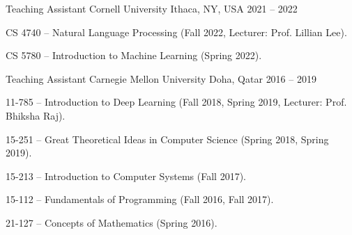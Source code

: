 
\begin{cventries}
  \cventry
    {Teaching Assistant}
    {Cornell University}
    {Ithaca, NY, USA}
    {2021 -- 2022}
    {
      \begin{cvitems}
        \item CS 4740 -- Natural Language Processing (Fall 2022, Lecturer: Prof. Lillian Lee).
        \item CS 5780 -- Introduction to Machine Learning (Spring 2022).
      \end{cvitems}
    }

  \cventry
    {Teaching Assistant}
    {Carnegie Mellon University}
    {Doha, Qatar}
    {2016 -- 2019}
    {
      \begin{cvitems}
        \item 11-785 -- Introduction to Deep Learning (Fall 2018, Spring 2019, Lecturer: Prof. Bhiksha Raj).
        \item 15-251 -- Great Theoretical Ideas in Computer Science (Spring 2018, Spring 2019).
        \item 15-213 -- Introduction to Computer Systems (Fall 2017).
        \item 15-112 -- Fundamentals of Programming (Fall 2016, Fall 2017).
        \item 21-127 -- Concepts of Mathematics (Spring 2016).
      \end{cvitems}
    }
\end{cventries}
